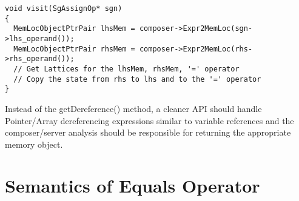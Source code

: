 \documentclass{article}
\begin{document}
\lstset{
label=code:transfer-eq,
caption=Transfer Function for Equals Operator
}
\begin{lstlisting}
void visit(SgAssignOp* sgn)
{
  MemLocObjectPtrPair lhsMem = composer->Expr2MemLoc(sgn->lhs_operand());
  MemLocObjectPtrPair rhsMem = composer->Expr2MemLoc(rhs->rhs_operand());
  // Get Lattices for the lhsMem, rhsMem, '=' operator
  // Copy the state from rhs to lhs and to the '=' operator
}
\end{lstlisting}

\noindent Instead of the getDereference() method, a cleaner API should handle Pointer/Array dereferencing expressions similar to variable references and the composer/server analysis should be responsible for returning the appropriate memory object.

\section{Semantics of Equals Operator}
\label{sec:sem-of-eq-op}
\end{document}
